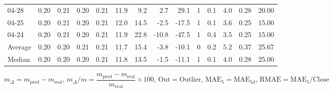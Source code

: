 \begin{threeparttable}
{\begin{tabular}{lrrrrrrrrrrrrr}
  04-28 &          0.20 &          0.21 &          0.20 &        0.21 &                11.9 &                 9.2 &        2.7 &         29.1 &              1 &                 0.1 &              4.0 &            0.28 &                  20.00 \\
  04-25 &          0.20 &          0.21 &          0.20 &        0.21 &                12.0 &                14.5 &       -2.5 &        -17.5 &              1 &                 0.1 &              3.6 &            0.25 &                  15.00 \\
  04-24 &          0.20 &          0.21 &          0.20 &        0.21 &                11.9 &                22.8 &      -10.8 &        -47.5 &              1 &                 0.4 &              3.5 &            0.25 &                  15.00 \\
Average &          0.20 &          0.20 &          0.21 &        0.21 &                11.7 &                15.4 &       -3.8 &        -10.1 &              0 &                 0.2 &              5.2 &            0.37 &                  25.67 \\
 Median &          0.20 &          0.20 &          0.20 &        0.21 &                11.8 &                13.5 &       -1.5 &        -11.1 &              1 &                 0.1 &              4.0 &            0.28 &                  25.00 \\
\bottomrule
\end{tabular}
}
\begin{tablenotes}\footnotesize
\item $m_\Delta=m_{\text{pred}}-m_{\text{real}}$,
$m_\Delta/m=\dfrac{m_{\text{pred}}-m_{\text{real}}}{m_{\text{real}}}\times100$,
$\mathrm{Out}=\text{Outlier}$,
$\mathrm{MAE}_5=\mathrm{MAE}_{5\text{d}}$,
$\mathrm{RMAE}=\mathrm{MAE}_5/\text{Close}$
\end{tablenotes}
\end{threeparttable}
\endgroup

